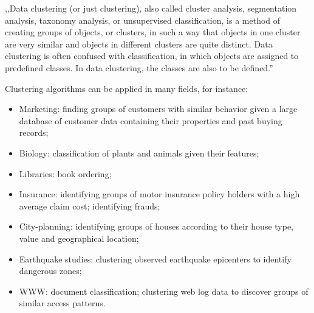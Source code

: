 ,,Data clustering (or just clustering), also called cluster analysis, segmentation analysis, taxonomy analysis, or unsupervised classification, is a method of creating groups of objects, or clusters, in such a way that objects in one cluster are very similar and objects in different clusters are quite distinct. Data clustering is often confused with classification, in which objects are assigned to predefined classes. In data clustering, the classes are also to be defined.''~\cite{data_clustering_book}


Clustering algorithms can be applied in many fields, for instance:

\begin{itemize}
\item Marketing: finding groups of customers with similar behavior given a large database of customer data containing their properties and past buying records;
\item Biology: classification of plants and animals given their features;
\item Libraries: book ordering;
\item Insurance: identifying groups of motor insurance policy holders with a high average claim cost; identifying frauds;
\item City-planning: identifying groups of houses according to their house type, value and geographical location;
\item Earthquake studies: clustering observed earthquake epicenters to identify dangerous zones;
\item WWW: document classification; clustering web log data to discover groups of similar access patterns.
\end{itemize}